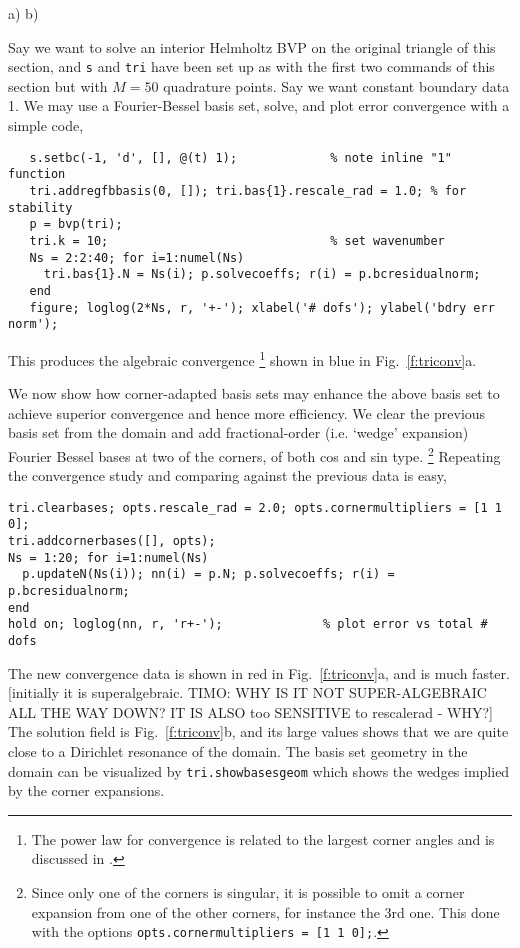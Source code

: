 \bfi %
a)
b)
\efi

Say we want to solve an interior Helmholtz BVP on the original triangle
of this section, and {\tt s} and {\tt tri} have been set up as with the
first two commands of this section but with $M=50$ quadrature points.
Say we want constant boundary data 1.
We may use a Fourier-Bessel basis set, solve, and
plot error convergence with a simple code,
\begin{verbatim}
   s.setbc(-1, 'd', [], @(t) 1);             % note inline "1" function
   tri.addregfbbasis(0, []); tri.bas{1}.rescale_rad = 1.0; % for stability
   p = bvp(tri);
   tri.k = 10;                               % set wavenumber
   Ns = 2:2:40; for i=1:numel(Ns)
     tri.bas{1}.N = Ns(i); p.solvecoeffs; r(i) = p.bcresidualnorm;
   end
   figure; loglog(2*Ns, r, '+-'); xlabel('# dofs'); ylabel('bdry err norm');
\end{verbatim}
This produces the algebraic convergence%
  \footnote{The power law for convergence is related to the largest corner
angles and is discussed in \cite{Ei74}.}
shown in blue in Fig.~\ref{f:triconv}a.

We now show how corner-adapted basis sets may enhance
the above basis set to achieve superior convergence and hence
more efficiency. We clear the previous basis set from the domain
and add fractional-order (i.e. `wedge' expansion) Fourier Bessel bases
at two of the corners, of both cos and sin type.%
  \footnote{Since only one of the corners is
    singular, it is possible to omit a corner
    expansion from one of the other corners, for instance the 3rd one.
    This done with the options {\tt opts.cornermultipliers = [1 1 0];}.}
Repeating the convergence
study and comparing against the previous data is easy,
\begin{verbatim}
tri.clearbases; opts.rescale_rad = 2.0; opts.cornermultipliers = [1 1 0];
tri.addcornerbases([], opts);
Ns = 1:20; for i=1:numel(Ns)
  p.updateN(Ns(i)); nn(i) = p.N; p.solvecoeffs; r(i) = p.bcresidualnorm;
end
hold on; loglog(nn, r, 'r+-');              % plot error vs total # dofs
\end{verbatim}
The new convergence data is shown in red in Fig.~\ref{f:triconv}a,
and is much faster.
[initially it is superalgebraic.
TIMO: WHY IS IT NOT SUPER-ALGEBRAIC ALL THE WAY DOWN?
IT IS ALSO too SENSITIVE to rescalerad - WHY?]
The solution field is Fig.~\ref{f:triconv}b, and its large values
shows that we are quite close to a Dirichlet resonance of the domain.
The basis set geometry in the domain can be visualized by
{\tt tri.showbasesgeom} which shows the wedges implied by the corner
expansions.

